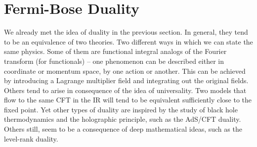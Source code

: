         \section{Fermi-Bose Duality} \label{Fermi-Bose_sec}
        We already met the idea of duality in the previous section. In general, they tend to be an equivalence of two theories. Two different ways in which we can state the same physics. Some of them are functional integral analogs of the Fourier transform (for functionals) -- one phenomenon can be described either in coordinate or momentum space, by one action or another. This can be achieved by introducing a Lagrange multiplier field and integrating out the original fields. Others tend to arise in consequence of the idea of universality. Two models that flow to the same CFT in the IR will tend to be equivalent sufficiently close to the fixed point.
        Yet other types of duality are inspired by the study of black hole thermodynamics and the holographic principle, such as the AdS/CFT duality. Others still, seem to be a consequence of deep mathematical ideas, such as the level-rank duality.

